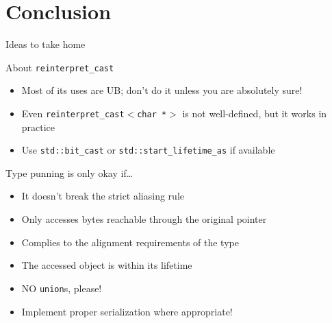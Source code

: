 \section{Conclusion}

\begin{frame}{Ideas to take home}
  \begin{block}{About \texttt{reinterpret\_cast}}
    \begin{itemize}
    \item Most of its uses are UB; don't do it unless you are absolutely sure!
    \item Even \texttt{reinterpret\_cast$<$char *$>$} is not well-defined, but it works in practice
    \item Use \texttt{std::bit\_cast} or \texttt{std::start\_lifetime\_as} if available
    \end{itemize}
  \end{block}

  \begin{block}{Type punning is only okay if\ldots}
    \begin{itemize}
    \item It doesn't break the strict aliasing rule
    \item Only accesses bytes reachable through the original pointer
    \item Complies to the alignment requirements of the type
    \item The accessed object is within its lifetime
    \item \alert{NO} \texttt{union}s, please!
    \end{itemize}
  \end{block}\vspace*{-1ex}

  \begin{itemize}
  \item Implement proper serialization where appropriate!
  \end{itemize}

\end{frame}
